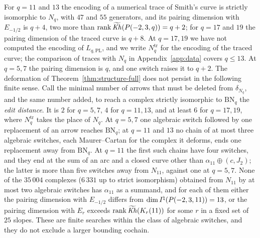 \begin{remark}\label{rem:q11}
For $q=11$ and $13$ the encoding of a numerical trace of Smith's curve is strictly isomorphic to
$N_q$, with $47$ and $55$ generators, and its pairing dimension with $E_{-1/2}$ is $q+4$, two more than
$\operatorname{rank}\widetilde{\mathit{Kh}}(P(-2,3,q))=q+2$; for $q=17$ and $19$ the pairing dimension of the traced curve is $q+8$.  At $q=17,19$ we
have not computed the encoding of $L_{q,\mathrm{PL}}$, and we write $N_q^{\mathrm{tr}}$ for the encoding of
the traced curve; the comparison of traces with $N_q$ in Appendix~\ref{app:data} covers $q\le13$.  At
$q=5,7$ the pairing dimension is $q$, and one switch raises it to $q+2$.  The deformation of
Theorem~\ref{thm:structure-full} does not persist in the following finite sense.  Call the minimal
number of arrows that must be deleted from $\delta_{N_q}$, and the same number added, to reach a
complex strictly isomorphic to $\mathrm{BN}_q$ the \emph{edit distance}.  It is $2$ for $q=5,7$, $4$
for $q=11,13$, and at least $6$ for $q=17,19$, where $N_q^{\mathrm{tr}}$ takes the place of $N_q$.  At $q=5,7$ one algebraic switch followed by one
replacement of an arrow reaches $\mathrm{BN}_q$; at $q=11$ and $13$ no chain of at most three
algebraic switches, each Maurer--Cartan for the complex it deforms, ends one replacement away from
$\mathrm{BN}_q$.  At $q=11$ the first such chains have four switches, and they end at the sum of an
arc and a closed curve other than $\alpha_{11}\oplus(c,J_2)$; the latter is more than five switches
away from $N_{11}$, against one at $q=5,7$.  None of the $35\,004$ complexes ($6\,331$ up to strict
isomorphism) obtained from $N_{11}$ by at most two algebraic switches has $\alpha_{11}$ as a summand, and
for each of them either the pairing dimension with $E_{-1/2}$ differs from $\dim I^{\natural}(P(-2,3,11))=13$, or
the pairing dimension with $E_r$ exceeds $\operatorname{rank}\widetilde{\mathit{Kh}}(K_r(11))$ for some $r$ in a fixed set of $25$
slopes.  These
are finite searches within the class of algebraic switches, and they do not exclude a larger bounding
cochain.
\end{remark}
